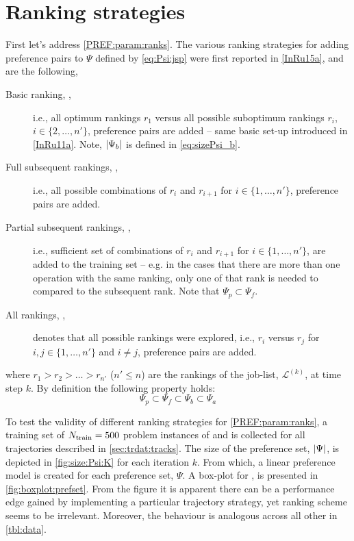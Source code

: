 \section{Ranking strategies}\label{sec:trdat:param:ranks}
First let's address \ref{PREF:param:ranks}. 
The various ranking strategies for adding preference pairs to $\Psi$ defined by 
\cref{eq:Psi:jsp} were first reported in \cref{InRu15a}, and are the following,
\begin{description}
    \item[Basic ranking, ,] i.e., all optimum rankings $r_1$ versus 
    all 
    possible suboptimum rankings $r_i$, $i\in\{2,\ldots,n'\}$, preference pairs 
    are added -- same basic set-up introduced in \cref{InRu11a}. Note, 
    $\lvert\Psi_b\rvert$ is defined in \cref{eq:sizePsi_b}.
    \item[Full subsequent rankings, ,] i.e., all possible 
    combinations 
    of $r_i$ and $r_{i+1}$ for $i\in\{1,\ldots,n'\}$, preference pairs are 
    added.
    \item[Partial subsequent rankings, ,] i.e., sufficient set of 
    combinations of $r_i$ and $r_{i+1}$ for $i\in\{1,\ldots,n'\}$, are added to 
    the training set -- e.g. in the cases that there are more than one 
    operation with the same ranking, only one of that rank is needed to 
    compared to the subsequent rank. Note that $\Psi_p\subset \Psi_f$.
    \item[All rankings, ,] denotes that all possible rankings were 
    explored, i.e.,
    $r_i$ versus $r_j$ for $i,j\in\{1,\ldots,n'\}$ and $i\neq j$, preference 
    pairs are added.
\end{description}
where $r_1>r_2>\ldots>r_{n'}$ ($n'\leq n$) are the rankings of the job-list, 
$\mathcal{L}^{(k)}$, at time step $k$.
By definition the following property holds:
\begin{equation}\label{eq:Psi:size}
    \Psi_p \subset \Psi_f \subset \Psi_b \subset \Psi_a
\end{equation}

To test the validity of different ranking strategies for 
\ref{PREF:param:ranks}, 
a training set of $N_{\text{train}}=500$ problem instances of  and 
 is collected for all trajectories described in 
\cref{sec:trdat:tracks}. 
The size of the preference set, $\lvert\Psi\rvert$, is depicted in 
\cref{fig:size:Psi:K} for each iteration $k$. 
From which, a linear preference model is created for each preference 
set, $\Psi$. A box-plot for \fullnamerho, is presented in 
\cref{fig:boxplot:prefset}. 
From the figure it is apparent there can be a performance edge gained by 
implementing a particular trajectory strategy, yet ranking scheme seems to be 
irrelevant. Moreover, the behaviour is analogous across all other 
\Problem[6\times5]{\train} in \cref{tbl:data}.

